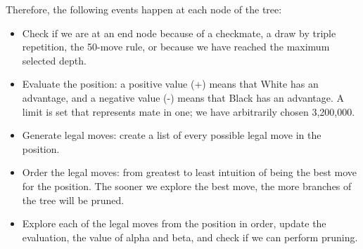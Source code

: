 \vspace{1em}

\noindent Therefore, the following events happen at each node of the tree:

\begin{itemize}
    \item Check if we are at an end node because of a checkmate, a draw by triple repetition, the 50-move rule, or because we have reached the maximum selected depth.
    \item Evaluate the position: a positive value (+) means that White has an advantage, and a negative value (-) means that Black has an advantage. A limit is set that represents mate in one; we have arbitrarily chosen 3,200,000.
    \item Generate legal moves: create a list of every possible legal move in the position.
    \item Order the legal moves: from greatest to least intuition of being the best move for the position. The sooner we explore the best move, the more branches of the tree will be pruned.
    \item Explore each of the legal moves from the position in order, update the evaluation, the value of alpha and beta, and check if we can perform pruning.
\end{itemize}

\vspace{1em}

